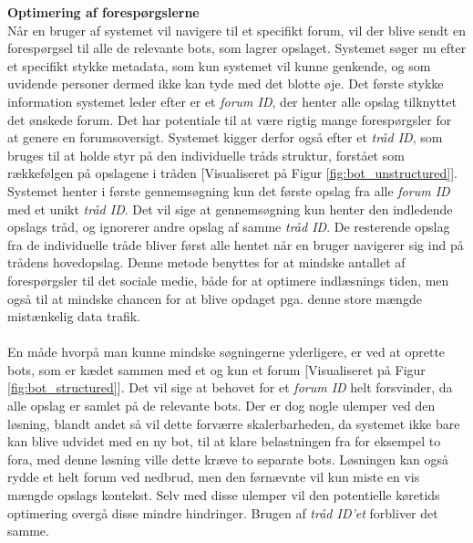 \textbf{Optimering af forespørgslerne}\\
Når en bruger af systemet vil navigere til et specifikt forum, vil der blive sendt en forespørgsel til alle de relevante bots, som lagrer opslaget. Systemet søger nu efter et specifikt stykke metadata, som kun systemet vil kunne genkende, og som uvidende personer dermed ikke kan tyde med det blotte øje. Det første stykke information systemet leder efter er et \textit{forum ID}, der henter alle opslag tilknyttet det ønskede forum. Det har potentiale til at være rigtig mange forespørgsler for at genere en forumsoversigt. Systemet kigger derfor også efter et \textit{tråd ID}, som bruges til at holde styr på den individuelle tråds struktur, forstået som rækkefølgen på opslagene i tråden [Visualiseret på Figur \ref{fig:bot_unstructured}].\\
Systemet henter i første gennemsøgning kun det første opslag fra alle \textit{forum ID} med et unikt \textit{tråd ID}. Det vil sige at gennemsøgning kun henter den indledende opslags tråd, og ignorerer andre opslag af samme \textit{tråd ID}. De resterende opslag fra de individuelle tråde bliver først alle hentet når en bruger navigerer sig ind på trådens hovedopslag. Denne metode benyttes for at mindske antallet af forespørgsler til det sociale medie, både for at optimere indlæsnings tiden, men også til at mindske chancen for at blive opdaget pga. denne store mængde mistænkelig data trafik.
\\\\
En måde hvorpå man kunne mindske søgningerne yderligere, er ved at oprette bots, som er kædet sammen med et og kun et forum [Visualiseret på Figur \ref{fig:bot_structured}]. Det vil sige at behovet for et \textit{forum ID} helt forsvinder, da alle opslag er samlet på de relevante bots. Der er dog nogle ulemper ved den løsning, blandt andet så vil dette forværre skalerbarheden, da systemet ikke bare kan blive udvidet med en ny bot, til at klare belastningen fra for eksempel to fora, med denne løsning ville dette kræve to separate bots. Løsningen kan også rydde et helt forum ved nedbrud, men den førnævnte vil kun miste en vis mængde opslags kontekst. Selv med disse ulemper vil den potentielle køretids optimering overgå disse mindre hindringer. Brugen af \textit{tråd ID'et} forbliver det samme.

